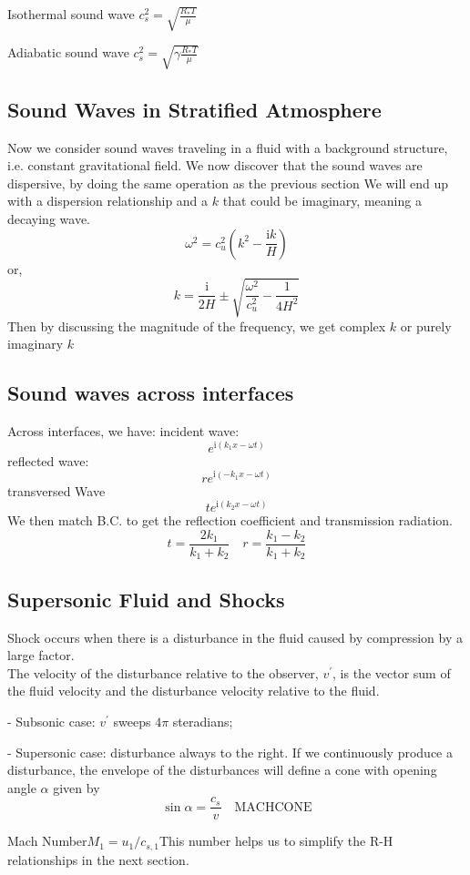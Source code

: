 \documentclass[12pt,a4paper]{article}
\begin{document}
    \begin{example}
        {Isothermal sound wave }
        {$c^2_s=\sqrt{\frac{R_{*}T}{\mu}}$}
    \end{example}

    \begin{example}
        {Adiabatic sound wave }
        {$c^2_s=\sqrt{\gamma\frac{R_{*}T}{\mu}}$}
    \end{example}

\subsection{Sound Waves in Stratified Atmosphere}
    Now we consider sound waves traveling in a fluid with a background structure, i.e. constant gravitational field. We now discover that the sound waves are dispersive, by doing the same operation as the previous section
    We will end up with a dispersion relationship and a $k$ that could be imaginary, meaning a decaying wave.
    $$
    \omega^2=c_u^2\left(k^2-\frac{\mathrm{i} k}{H}\right)
    $$
    or,
    $$
    k=\frac{\mathrm{i}}{2 H} \pm \sqrt{\frac{\omega^2}{c_u^2}-\frac{1}{4 H^2}}
    $$
    Then by discussing the magnitude of the frequency, we get complex $k$ or purely imaginary $k$
\subsection{Sound waves across interfaces}
    Across interfaces, we have:
    incident wave:
    $$
    e^{\mathrm{i}\left(k_1 x-\omega t\right)}
    $$
    reflected wave:
    $$
    r e^{\mathrm{i}\left(-k_1 x-\omega t\right)}
    $$
    transversed Wave
    $$
    t e^{\mathrm{i}\left(k_2 x-\omega t\right)}
    $$
    We then match B.C. to get the reflection coefficient and transmission radiation.
    $$
    t=\frac{2 k_1}{k_1+k_2} \quad r=\frac{k_1-k_2}{k_1+k_2}
    $$
\subsection{Supersonic Fluid and Shocks}
    Shock occurs when there is a disturbance in the fluid caused by compression by a large factor.\\
    The velocity of the disturbance relative to the observer, $v^{\prime}$, is the vector sum of the fluid velocity and the disturbance velocity relative to the fluid.
    
    - Subsonic case: $v^{\prime}$ sweeps $4 \pi$ steradians;
    
    - Supersonic case: disturbance always to the right. If we continuously produce a disturbance, the envelope of the disturbances will define a cone with opening angle $\alpha$ given by
    $$
    \sin \alpha=\frac{c_s}{v} \quad \mathrm{MACH} \mathrm{CONE}
    $$
    \begin{definition}
        {Mach Number}{$M_1= u_1/c_{s,1}$}{This number helps us to simplify the R-H relationships in the next section.}
    \end{definition}
\end{document}

